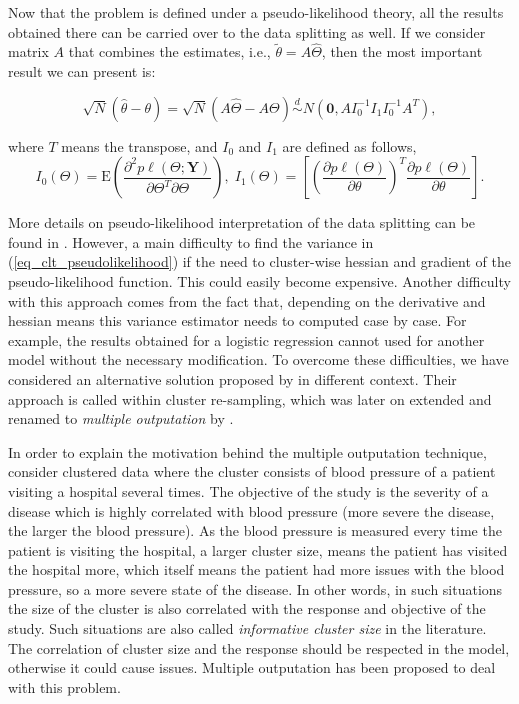 \documentclass[11pt,a5paper,twoside]{book}
\begin{document}
Now that the problem is defined under a pseudo-likelihood theory, all the results obtained there can be carried over to the data splitting as well. If we consider matrix $A$ that combines the estimates, i.e., $\widetilde{\theta} = A\widehat{\Theta}$, then the most important result we can present is:

\begin{equation}
\label{eq_clt_pseudolikelihood}
\sqrt{N}(\widehat{\theta} - \theta) = \sqrt{N}(A\widehat{\Theta} - A\Theta) \stackrel{d}{\sim} N\left(\mathbf{0}, A I_0^{-1} I_1 I_0^{-1} A^{T}\right),
\end{equation}

where $T$ means the transpose, and $I_0$ and $I_1$ are defined as follows,
\begin{equation}
\label{eq_hessian_gradient_pl}
I_0(\Theta) = \mathrm{E} \left(\frac{\partial^2 p\ell(\Theta; \mathbf{Y})}{\partial \Theta^T \partial \Theta} \right),\; I_1(\Theta) = \left[\left(\frac{\partial p\ell(\Theta)}{\partial \theta} \right)^T \frac{\partial p\ell(\Theta)}{\partial \theta}  \right].
\end{equation}

More details on pseudo-likelihood interpretation of the data splitting can be found in \cite{Iddi2011}. However, a main difficulty to find the variance in (\ref{eq_clt_pseudolikelihood}) if the need to cluster-wise hessian and gradient of the pseudo-likelihood function. This could easily become expensive. Another difficulty with this approach comes from the fact that, depending on the derivative and hessian means this variance estimator needs to computed case by case. For example, the results obtained for a logistic regression cannot used for another model without the necessary modification. To overcome these difficulties, we have considered an alternative solution proposed by \cite{hoffman2001} in different context. Their approach is called within cluster re-sampling, which was later on extended and renamed to \emph{multiple outputation} by \cite{follmann2003}.

In order to explain the motivation behind the multiple outputation technique, consider clustered data where the cluster consists of blood pressure of a patient visiting a hospital several times. The objective of the study is the severity of a disease which is highly correlated with blood pressure (more severe the disease, the larger the blood pressure). As the blood pressure is measured every time the patient is visiting the hospital, a larger cluster size, means the patient has visited the hospital more, which itself means the patient had more issues with the blood pressure, so a more severe state of the disease. In other words, in such situations the size of the cluster is also correlated with the response and objective of the study. Such situations are also called \emph{informative cluster size} in the literature. The correlation of cluster size and the response should be respected in the model, otherwise it could cause issues. Multiple outputation has been proposed to deal with this problem.
\end{document}
